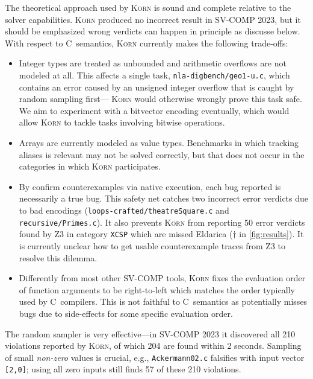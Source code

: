 \documentclass{llncs}
\newcommand{\Korn}{\textsc{Korn}\xspace}
\begin{document}
The theoretical approach used by \Korn is sound and complete
relative to the solver capabilities.
\Korn produced no incorrect result in SV-COMP 2023,
but it should be emphasized wrong verdicts can happen in principle as discusse below.
With respect to C~semantics, \Korn currently makes the following trade-offs:
\begin{itemize}
\item Integer types are treated as unbounded and arithmetic overflows are not modeled at all.
 This affects a single task, \texttt{nla-digbench/geo1-u.c},
 which contains an error caused by an unsigned integer overflow
 that is caught by random sampling first---
 \Korn would otherwise wrongly prove this task safe.
 We aim to experiment with a bitvector encoding eventually,
 which would allow \Korn to tackle tasks involving bitwise operations.
\item Arrays are currently modeled as value types.
 Benchmarks in which tracking aliases is relevant
 may not be solved correctly, but that does not occur in the categories in which \Korn participates.
\item By confirm counterexamples via native execution,
 each bug reported is necessarily a true bug.
 This safety net catches two incorrect error verdicts due to bad encodings
 (\texttt{loops-crafted/theatreSquare.c} and \texttt{recursive/Primes.c}).
 It also prevents \Korn from reporting 50 error verdicts found by Z3 in category \texttt{XCSP}
 which are missed Eldarica ($\dagger$ in \cref{fig:results}).
 It is currently unclear how to get usable counterexample traces from Z3 to resolve this dilemma.
\item
 Differently from most other SV-COMP tools, \Korn fixes the evaluation order of function arguments to be right-to-left
 which matches the order typically used by C~compilers.
 This is not faithful to C~semantics as potentially misses bugs due to side-effects
 for some specific evaluation order.
\end{itemize}

The random sampler is very effective---in SV-COMP 2023 it discovered
all 210 violations reported by \Korn, of which 204 are found within 2 seconds.
Sampling of small \emph{non-zero} values is crucial, e.g., \texttt{Ackermann02.c}
falsifies with input vector \texttt{[2,0]};
using all zero inputs still finds 57 of these 210 violations.
\end{document}
